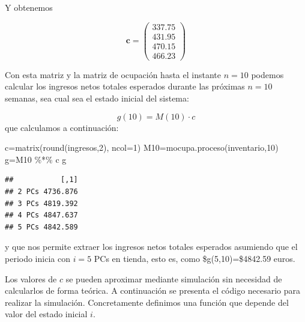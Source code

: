 \documentclass[
]{book}
\newenvironment{Shaded}{\begin{snugshade}}{\end{snugshade}}
\newcommand{\AttributeTok}[1]{\textcolor[rgb]{0.77,0.63,0.00}{#1}}
\newcommand{\DecValTok}[1]{\textcolor[rgb]{0.00,0.00,0.81}{#1}}
\newcommand{\FunctionTok}[1]{\textcolor[rgb]{0.00,0.00,0.00}{#1}}
\newcommand{\NormalTok}[1]{#1}
\newcommand{\OtherTok}[1]{\textcolor[rgb]{0.56,0.35,0.01}{#1}}
\newcommand{\SpecialCharTok}[1]{\textcolor[rgb]{0.00,0.00,0.00}{#1}}
\theoremstyle{definition}
\theoremstyle{definition}
\theoremstyle{definition}
\theoremstyle{definition}
\theoremstyle{remark}
\begin{document}
Y obtenemos

\[\mathbf{c} = 
\begin{pmatrix}
337.75 \\
431.95 \\
470.15 \\
466.23 
\end{pmatrix}\]

Con esta matriz y la matriz de ocupación hasta el instante \(n=10\) podemos calcular los ingresos netos totales esperados durante las próximas \(n=10\) semanas, sea cual sea el estado inicial del sistema:

\[g(10)=M(10) \cdot c\]
que calculamos a continuación:

\begin{Shaded}
\begin{Highlighting}[]
\NormalTok{c}\OtherTok{=}\FunctionTok{matrix}\NormalTok{(}\FunctionTok{round}\NormalTok{(ingresos,}\DecValTok{2}\NormalTok{), }\AttributeTok{ncol=}\DecValTok{1}\NormalTok{)}
\NormalTok{M10}\OtherTok{=}\FunctionTok{mocupa.proceso}\NormalTok{(inventario,}\DecValTok{10}\NormalTok{)}
\NormalTok{g}\OtherTok{=}\NormalTok{M10 }\SpecialCharTok{\%*\%}\NormalTok{ c}
\NormalTok{g}
\end{Highlighting}
\end{Shaded}

\begin{verbatim}
##           [,1]
## 2 PCs 4736.876
## 3 PCs 4819.392
## 4 PCs 4847.637
## 5 PCs 4842.589
\end{verbatim}

y que nos permite extraer los ingresos netos totales esperados asumiendo que el periodo inicia con \(i=5\) PCs en tienda, esto es, como \$g(5,10)=\$4842.59 euros.

Los valores de \(c\) se pueden aproximar mediante simulación sin necesidad de calcularlos de forma teórica. A continuación se presenta el código necesario para realizar la simulación. Concretamente definimos una función que depende del valor del estado inicial \(i\).
\end{document}
